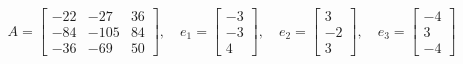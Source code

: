 \documentclass[11pt]{report}
\begin{document}
$$A = \left[\begin{matrix}-22 & -27 & 36\\-84 & -105 & 84\\-36 & -69 & 50\end{matrix}\right],\quad e_1 = \left[\begin{matrix}-3\\-3\\4\end{matrix}\right],\quad e_2 = \left[\begin{matrix}3\\-2\\3\end{matrix}\right],\quad e_3 = \left[\begin{matrix}-4\\3\\-4\end{matrix}\right]$$
\end{document}

